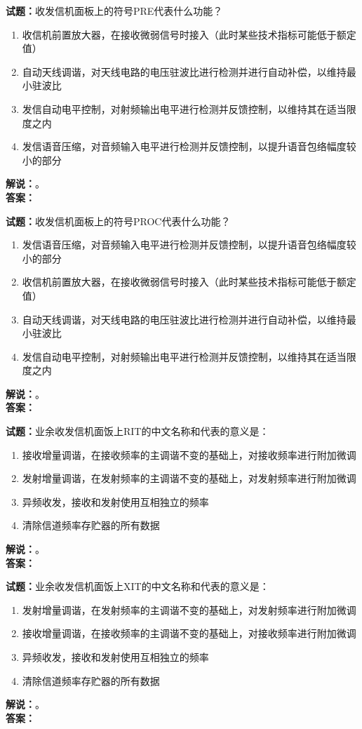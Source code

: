 \documentclass{ctexbook}
\begin{document}
\noindent\textbf{试题：}收发信机面板上的符号PRE代表什么功能？
\begin{enumerate}[leftmargin=3em]
  \item 收信机前置放大器，在接收微弱信号时接入（此时某些技术指标可能低于额定值）
  \item 自动天线调谐，对天线电路的电压驻波比进行检测并进行自动补偿，以维持最小驻波比
  \item 发信自动电平控制，对射频输出电平进行检测并反馈控制，以维持其在适当限度之内
  \item 发信语音压缩，对音频输入电平进行检测并反馈控制，以提升语音包络幅度较小的部分
\end{enumerate}
\noindent\textbf{解说：}\textbf{}。\\\noindent\textbf{答案：}

\bigskip

\noindent\textbf{试题：}收发信机面板上的符号PROC代表什么功能？
\begin{enumerate}[leftmargin=3em]
  \item 发信语音压缩，对音频输入电平进行检测并反馈控制，以提升语音包络幅度较小的部分
  \item 收信机前置放大器，在接收微弱信号时接入（此时某些技术指标可能低于额定值）
  \item 自动天线调谐，对天线电路的电压驻波比进行检测并进行自动补偿，以维持最小驻波比
  \item 发信自动电平控制，对射频输出电平进行检测并反馈控制，以维持其在适当限度之内
\end{enumerate}
\noindent\textbf{解说：}\textbf{}。\\\noindent\textbf{答案：}

\bigskip

\noindent\textbf{试题：}业余收发信机面饭上RIT的中文名称和代表的意义是：
\begin{enumerate}[leftmargin=3em]
  \item 接收增量调谐，在接收频率的主调谐不变的基础上，对接收频率进行附加微调
  \item 发射增量调谐，在发射频率的主调谐不变的基础上，对发射频率进行附加微调
  \item 异频收发，接收和发射使用互相独立的频率
  \item 清除信道频率存贮器的所有数据
\end{enumerate}
\noindent\textbf{解说：}\textbf{}。\\\noindent\textbf{答案：}

\bigskip

\noindent\textbf{试题：}业余收发信机面饭上XIT的中文名称和代表的意义是：
\begin{enumerate}[leftmargin=3em]
  \item 发射增量调谐，在发射频率的主调谐不变的基础上，对发射频率进行附加微调
  \item 接收增量调谐，在接收频率的主调谐不变的基础上，对接收频率进行附加微调
  \item 异频收发，接收和发射使用互相独立的频率
  \item 清除信道频率存贮器的所有数据
\end{enumerate}
\noindent\textbf{解说：}\textbf{}。\\\noindent\textbf{答案：}
\end{document}
